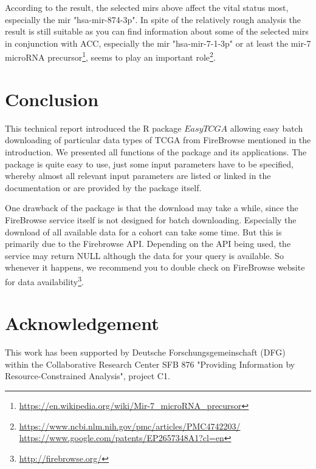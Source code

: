 \documentclass{TechReport}
\begin{document}
According to the result, the selected mirs above affect the vital status most,
especially the mir "hsa-mir-874-3p". In spite of the relatively rough analysis
the result is still suitable as you can find information about some of the selected mirs
 in conjunction with ACC, especially the mir "hsa-mir-7-1-3p" or at least the mir-7
 microRNA precursor\footnote{\url{https://en.wikipedia.org/wiki/Mir-7_microRNA_precursor}}, 
seems to play an important  role\footnote{\url{https://www.ncbi.nlm.nih.gov/pmc/articles/PMC4742203/}\\
 \url{https://www.google.com/patents/EP2657348A1?cl=en}}.


\section{Conclusion}
This technical report introduced the R package $EasyTCGA$ allowing
easy batch downloading of particular data types of TCGA from
FireBrowse mentioned in the introduction.  We presented all functions
of the package and its applications. The package is quite easy to use,
just some input parameters have to be specified, whereby almost all
relevant input parameters are
listed or linked in the documentation or are provided by the package itself.

One drawback of the package is that the download may take a while,
since the FireBrowse service itself is not designed for batch
downloading. Especially the download of all available data for a
cohort can take some time. But this is primarily due to the Firebrowse
API. Depending on the API being used, the service may return NULL
although the data for your query is available.
So whenever it happens, we recommend you to double check on FireBrowse website for data availability\footnote{\url{http://firebrowse.org/}}.





\newpage
\section*{Acknowledgement}

This work has been supported by Deutsche Forschungsgemeinschaft
   (DFG) within the Collaborative Research Center SFB 876 "Providing
   Information by Resource-Constrained Analysis", project C1.
\end{document}
